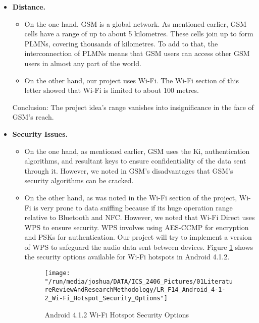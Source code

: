 \documentclass[12pt,svgnames,smaller]{article} %
\begin{document}
	\begin{itemize}
		
		\item \textbf{Distance.}
		
		\begin{itemize}
			\item On the one hand, GSM is a global network. As mentioned earlier, GSM cells have a range of up to about 5 kilometres. These cells join up to form PLMNs, covering thousands of kilometres. To add to that, the interconnection of PLMNs means that GSM users can access other GSM users in almost any part of the world. 
			\item On the other hand, our project uses Wi-Fi. The Wi-Fi section of this letter showed that Wi-Fi is limited to about 100 metres. 
		\end{itemize}
		
		Conclusion: The project idea’s range vanishes into insignificance in the face of GSM’s reach.
		
		
		\item \textbf{Security Issues.}
		
		\begin{itemize}
			\item On the one hand, as mentioned earlier, GSM uses the Ki, authentication algorithms, and resultant keys to ensure confidentiality of the data sent through it. However, we noted in GSM’s disadvantages that GSM’s security algorithms can be cracked. 
			\item On the other hand, as was noted in the Wi-Fi section of the project, Wi-Fi is very prone to data sniffing because if its huge operation range relative to Bluetooth and NFC. However, we noted that Wi-Fi Direct uses WPS to ensure security. WPS involves using AES-CCMP for encryption and PSKs for authentication. Our project will try to implement a version of WPS to safeguard the audio data sent between devices.  Figure \ref{fig:LiteratureReview-Figure14} shows the security options available for Wi-Fi hotspots in Android 4.1.2.
			
			\begin{figure}
				\centering
				\texttt{[image: "/run/media/joshua/DATA/ICS\_2406\_Pictures/01LiteratureReviewAndResearchMethodology/LR\_F14\_Android\_4-1-2\_Wi-Fi\_Hotspot\_Security\_Options"]}
				\caption{Android 4.1.2 Wi-Fi Hotspot Security Options}
				\label{fig:LiteratureReview-Figure14}
			\end{figure}
			

\end{itemize}
\end{itemize}
\end{document}
